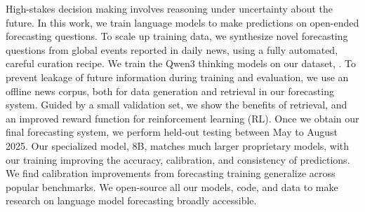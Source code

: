  High-stakes decision making involves reasoning under uncertainty about the future. In this work, we train language models to make predictions on open-ended forecasting questions. To scale up training data, we synthesize novel forecasting questions from global events reported in daily news, using a fully automated, careful curation recipe. We train the Qwen3 thinking models on our dataset, \ourdataset.  To prevent leakage of future information during training and evaluation, we use an offline news corpus, both for data generation and retrieval in our forecasting system. Guided by a small validation set, we show the benefits of retrieval, and an improved reward function for reinforcement learning (RL). Once we obtain our final forecasting system, we perform held-out testing between May to August 2025. Our specialized model, \ourmodel  8B, matches much larger proprietary models, with our training improving the accuracy, calibration, and consistency of predictions. We find calibration improvements from forecasting training generalize across popular benchmarks. We open-source all our models, code, and data to make research on language model forecasting broadly accessible. %